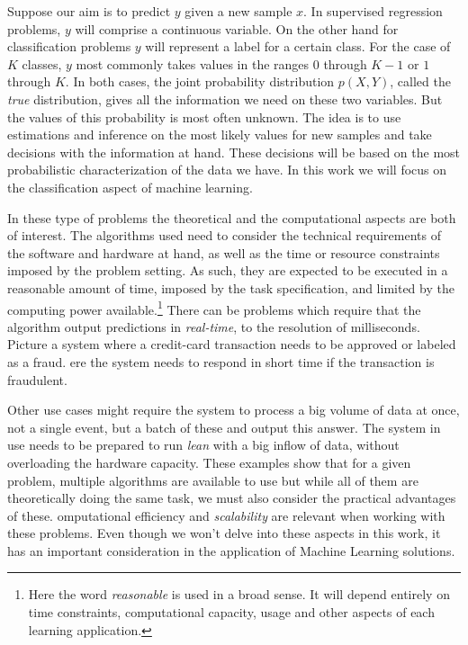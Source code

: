Suppose our aim is to predict $y$ given a new sample $x$.
In supervised regression problems, $y$ will comprise a continuous variable.
On the other hand for classification problems $y$ will represent a label for a certain class.
For the case of $K$ classes, $y$ most commonly takes values in the ranges $0$ through $K-1$ or $1$ through $K$.
In both cases, the joint probability distribution $p(X, Y)$, called the \textit{true} distribution, gives all the information we need on these two variables.
But the values of this probability is most often unknown.
The idea is to use estimations and inference on the most likely values for new samples and take decisions with the information at hand.
These decisions will be based on the most probabilistic characterization of the data we have.
In this work we will focus on the classification aspect of machine learning.

In these type of problems the theoretical and the computational aspects are both of interest.
The algorithms used need to consider the technical requirements of the software and hardware at hand, as well as the time or resource constraints imposed by the problem setting.
As such, they are expected to be executed in a reasonable amount of time, imposed by the task specification, and limited by the computing power available.\footnote{Here the word \textit{reasonable} is used in a broad sense.
It will depend entirely on time constraints, computational capacity, usage and other aspects of each learning application.} There can be problems which require that the algorithm output predictions in \textit{real-time}, to the resolution of milliseconds.
Picture a system where a credit-card transaction needs to be approved or labeled as a fraud.
ere the system needs to respond in short time if the transaction is fraudulent.

Other use cases might require the system to process a big volume of data at once, not a single event, but a batch of these and output this answer.
The system in use needs to be prepared to run \textit{lean} with a big inflow of data, without overloading the hardware capacity.
These examples show that for a given problem, multiple algorithms are available to use but while all of them are theoretically doing the same task, we must also consider the practical advantages of these.
omputational efficiency and \textit{scalability} are relevant when working with these problems.
Even though we won't delve into these aspects in this work, it has an important consideration in the application of Machine Learning solutions.


